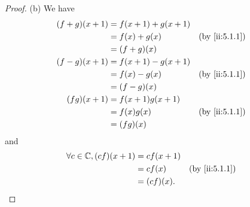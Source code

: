 \begin{proof}{(b)}
  We have
  \begin{align*}
    (f + g)(x + 1) & = f(x + 1) + g(x + 1)                    \\
                   & = f(x) + g(x)         &  & \by{ii:5.1.1} \\
                   & = (f + g)(x)                             \\
    (f - g)(x + 1) & = f(x + 1) - g(x + 1)                    \\
                   & = f(x) - g(x)         &  & \by{ii:5.1.1} \\
                   & = (f - g)(x)                             \\
    (f g)(x + 1)   & = f(x + 1) g(x + 1)                      \\
                   & = f(x) g(x)           &  & \by{ii:5.1.1} \\
                   & = (f g)(x)
  \end{align*}
  and
  \begin{align*}
    \forall c \in \C, (c f)(x + 1) & = c f(x + 1)                    \\
                                   & = c f(x)     &  & \by{ii:5.1.1} \\
                                   & = (c f)(x).
  \end{align*}
\end{proof}

